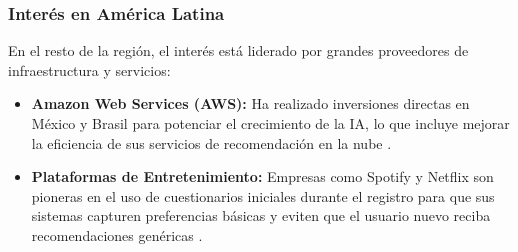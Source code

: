 \documentclass[12pt]{article}
\begin{document}
\subsubsection{Interés en América Latina}
En el resto de la región, el interés está liderado por grandes proveedores de infraestructura y servicios:

\begin{itemize}
\item \textbf{Amazon Web Services (AWS):} Ha realizado inversiones directas en México y Brasil para potenciar el crecimiento de la IA, lo que incluye mejorar la eficiencia de sus servicios de recomendación en la nube \cite{tudatos-ecuador-ia}.
\item \textbf{Plataformas de Entretenimiento:} Empresas como Spotify y Netflix son pioneras en el uso de cuestionarios iniciales durante el registro para que sus sistemas capturen preferencias básicas y eviten que el usuario nuevo reciba recomendaciones genéricas \cite{freecodecamp-cold-start-problem}.
\end{itemize}
\end{document}
